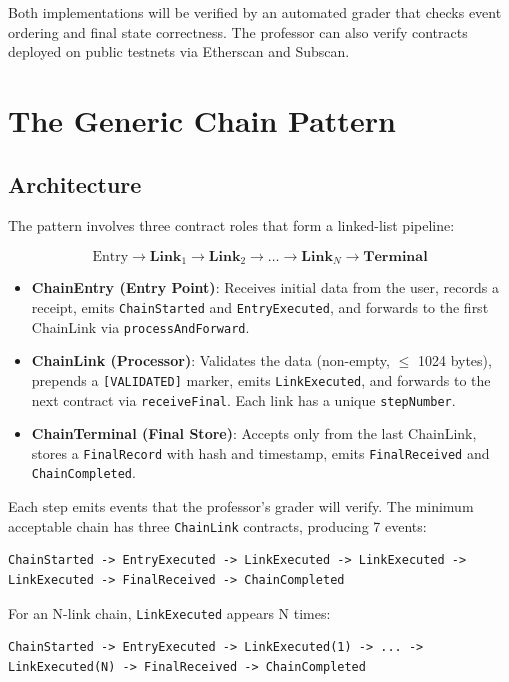 \documentclass[11pt,a4paper]{article}
\begin{document}
Both implementations will be verified by an automated grader that checks event
ordering and final state correctness. The professor can also verify contracts
deployed on public testnets via Etherscan and Subscan.

\section{The Generic Chain Pattern}

\subsection{Architecture}

The pattern involves three contract roles that form a linked-list pipeline:

\[
\text{Entry} \longrightarrow \textbf{Link}_1 \longrightarrow \textbf{Link}_2 \longrightarrow \ldots \longrightarrow \textbf{Link}_N \longrightarrow \textbf{Terminal}
\]

\begin{itemize}
    \item \textbf{ChainEntry (Entry Point)}: Receives initial data from the user,
          records a receipt, emits \texttt{ChainStarted} and \texttt{EntryExecuted},
          and forwards to the first ChainLink via \texttt{processAndForward}.
    \item \textbf{ChainLink (Processor)}: Validates the data (non-empty,
          $\le$ 1024 bytes), prepends a \texttt{[VALIDATED]} marker, emits
          \texttt{LinkExecuted}, and forwards to the next contract via
          \texttt{receiveFinal}. Each link has a unique \texttt{stepNumber}.
    \item \textbf{ChainTerminal (Final Store)}: Accepts only from the last
          ChainLink, stores a \texttt{FinalRecord} with hash and timestamp,
          emits \texttt{FinalReceived} and \texttt{ChainCompleted}.
\end{itemize}

Each step emits events that the professor's grader will verify.
The minimum acceptable chain has three \texttt{ChainLink} contracts, producing
7 events:
\begin{verbatim}
ChainStarted -> EntryExecuted -> LinkExecuted -> LinkExecuted -> LinkExecuted -> FinalReceived -> ChainCompleted
\end{verbatim}

For an N-link chain, \texttt{LinkExecuted} appears N times:
\begin{verbatim}
ChainStarted -> EntryExecuted -> LinkExecuted(1) -> ... -> LinkExecuted(N) -> FinalReceived -> ChainCompleted
\end{verbatim}
\end{document}
